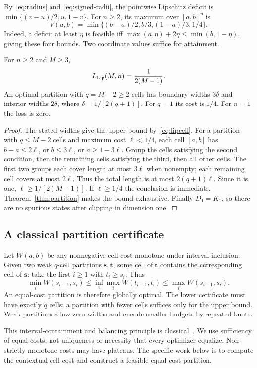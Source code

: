 By~\eqref{eq:radius} and~\eqref{eq:signed-radii}, the pointwise Lipschitz deficit is
$\min\{(v-u)/2,u,1-v\}$.
For $n\ge2$, its maximum over $[a,b]^n$ is
\begin{equation}\label{eq:lipcell}
V(a,b)=\min\{(b-a)/2,b/3,(1-a)/3,1/4\}.
\end{equation}
Indeed, a deficit at least $\eta$ is feasible iff
$\max(a,\eta)+2\eta\le\min(b,1-\eta)$, giving these four bounds. Two coordinate values suffice for attainment.

\begin{theorem}\label{thm:lipschitz}
For $n\ge2$ and $M\ge3$,
\[
L_{\mathrm{Lip}}(M,n)=\frac1{2(M-1)}.
\]
An optimal partition with $q=M-2\ge2$ cells has boundary widths $3\delta$ and interior widths $2\delta$, where $\delta=1/[2(q+1)]$. For $q=1$ its cost is $1/4$. For $n=1$ the loss is zero.
\end{theorem}
\begin{proof}
The stated widths give the upper bound by~\eqref{eq:lipcell}. For a partition with $q\le M-2$ cells and maximum cost $\ell<1/4$, each cell $[a,b]$ has $b-a\le2\ell$, or $b\le3\ell$, or $a\ge1-3\ell$. Group the cells satisfying the second condition, then the remaining cells satisfying the third, then all other cells. The first two groups each cover length at most $3\ell$ when nonempty; each remaining cell covers at most $2\ell$. Thus the total length is at most $2(q+1)\ell$. Since it is one, $\ell\ge1/[2(M-1)]$. If $\ell\ge1/4$ the conclusion is immediate. Theorem~\ref{thm:partition} makes the bound exhaustive. Finally $D_1=K_1$, so there are no spurious states after clipping in dimension one.
\end{proof}

\subsection{A classical partition certificate}\label{sec:partition-certificate}
Let $W(a,b)$ be any nonnegative cell cost monotone under interval inclusion. Given two weak $q$-cell partitions $\boldsymbol s,\boldsymbol t$, some cell of $\boldsymbol t$ contains the corresponding cell of $\boldsymbol s$: take the first $i\ge1$ with $t_i\ge s_i$. Thus
\begin{equation}\label{eq:partition-certificate}
\min_i W(s_{i-1},s_i)\le
\inf_{\boldsymbol t}\max_i W(t_{i-1},t_i)\le
\max_i W(s_{i-1},s_i).
\end{equation}
An equal-cost partition is therefore globally optimal. The lower certificate must have exactly $q$ cells; a partition with fewer cells suffices only for the upper bound. Weak partitions allow zero widths and encode smaller budgets by repeated knots.

This interval-containment and balancing principle is classical~\cite[Lemma~2.12]{tilli2019}. We use sufficiency of equal costs, not uniqueness or necessity that every optimizer equalize. Non-strictly monotone costs may have plateaus. The specific work below is to compute the contextual cell cost and construct a feasible equal-cost partition.
